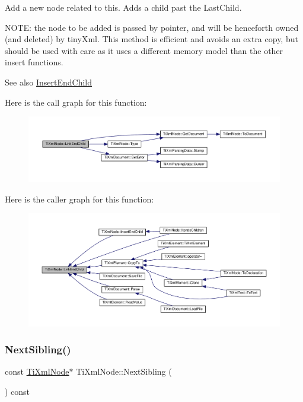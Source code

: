 Add a new node related to this. Adds a child past the Last\+Child.

N\+O\+TE\+: the node to be added is passed by pointer, and will be henceforth owned (and deleted) by tiny\+Xml. This method is efficient and avoids an extra copy, but should be used with care as it uses a different memory model than the other insert functions.

\begin{DoxySeeAlso}{See also}
\hyperlink{class_ti_xml_node_af287a913ce46d8dbf7ef24fec69bbaf0}{Insert\+End\+Child} 
\end{DoxySeeAlso}
Here is the call graph for this function\+:\nopagebreak
\begin{figure}[H]
\begin{center}
\leavevmode
\includegraphics[width=350pt]{class_ti_xml_node_a1a881212554b759865f6cac79a851d38_cgraph}
\end{center}
\end{figure}
Here is the caller graph for this function\+:\nopagebreak
\begin{figure}[H]
\begin{center}
\leavevmode
\includegraphics[width=350pt]{class_ti_xml_node_a1a881212554b759865f6cac79a851d38_icgraph}
\end{center}
\end{figure}
\mbox{\label{class_ti_xml_node_ae99c572ac7901a15993ea7a4efaa10e7}} 
\subsubsection{\texorpdfstring{Next\+Sibling()}{NextSibling()}\hspace{0.1cm}{\footnotesize\ttfamily [1/4]}}
{\footnotesize\ttfamily const \hyperlink{class_ti_xml_node}{Ti\+Xml\+Node}$\ast$ Ti\+Xml\+Node\+::\+Next\+Sibling (\begin{DoxyParamCaption}{ }\end{DoxyParamCaption}) const\hspace{0.3cm}{\ttfamily [inline]}}




